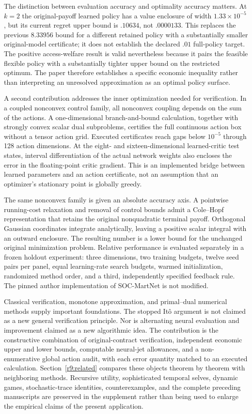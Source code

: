 The distinction between evaluation accuracy and optimality accuracy matters. At $k=2$ the original-payoff learned policy has a value enclosure of width $1.33\times10^{-5}$, but its current regret upper bound is $.10634$, not $.0000133$. This replaces the previous $8.33956$ bound for a different retained policy with a substantially smaller original-model certificate; it does not establish the declared $.01$ full-policy target. The positive access-welfare result is valid nevertheless because it pairs the feasible flexible policy with a substantially tighter upper bound on the restricted optimum. The paper therefore establishes a specific economic inequality rather than interpreting an unresolved approximation as an optimal policy surface.

A second contribution addresses the inner optimization needed for verification. In a coupled nonconvex control family, all nonconvex coupling depends on the sum of the actions. A one-dimensional branch-and-bound calculation, together with strongly convex scalar dual subproblems, certifies the full continuous action box without a tensor action grid. Executed certificates reach gaps below $10^{-5}$ through 128 action dimensions. At the eight- and sixteen-dimensional learned-critic test states, interval differentiation of the actual network weights also encloses the error in the floating-point critic gradient. This is an implemented bridge between learned parameters and an action certificate, not an assumption that an optimizer's stationary point is globally greedy.

The same nonconvex family is given an absolute accuracy axis. A pointwise running-cost relaxation and removal of control bounds admit a Cole--Hopf representation that retains the original nonquadratic terminal payoff. Orthogonal Gaussian coordinates integrate analytically, leaving a positive scalar integral with an outward enclosure. The resulting number is a lower bound for the unchanged original minimization problem. Relative performance is evaluated separately in a frozen holdout experiment: three dimensions, two training budgets, twelve seed pairs per panel, equal learning-rate search budgets, warmed initialization, randomized method order, and a third, independently specified feedback rule. The pinned author implementation of SOC-MartNet is not modified.

Classical verification, monotone approximation, and primal--dual numerical methods supply important foundations. The stopped It\^o argument is not claimed as a new general verification principle. Nor is alternating neural evaluation and improvement claimed as a new algorithmic idea. The contribution is the constructive combination of original-contract verification, independent economic upper and lower bounds, computable neural-jet allowances, and a non-enumerative global action audit, with each error quantity matched to an executed calculation. Section~\ref{r9:related} compares these objects theorem by theorem with neighboring methods. Recursive utility, sophisticated temporal selves, dynamic games, stochastic-trace identities, counterexamples, and the complete preceding manuscripts are preserved in the supplement rather than being used to enlarge the empirical claims of the present application.

